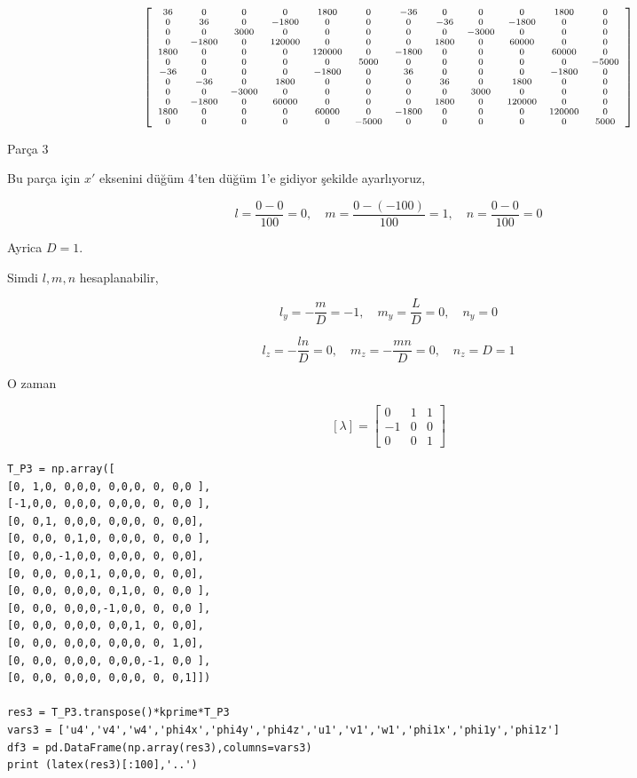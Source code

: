 \documentclass[12pt,fleqn]{article}\usepackage{../../common}
\begin{document}
$$
\scriptsize
\left[\begin{array}{cccccccccccc}36 & 0 & 0 & 0 & 1800 & 0 & -36 & 0 & 0 & 0 &
    1800 & 0\\0 & 36 & 0 & -1800 & 0 & 0 & 0 & -36 & 0 & -1800 & 0 & 0\\0 & 0 &
    3000 & 0 & 0 & 0 & 0 & 0 & -3000 & 0 & 0 & 0\\0 & -1800 & 0 & 120000 & 0 & 0
    & 0 & 1800 & 0 & 60000 & 0 & 0\\1800 & 0 & 0 & 0 & 120000 & 0 & -1800 & 0 &
    0 & 0 & 60000 & 0\\0 & 0 & 0 & 0 & 0 & 5000 & 0 & 0 & 0 & 0 & 0 & -5000\\-36
    & 0 & 0 & 0 & -1800 & 0 & 36 & 0 & 0 & 0 & -1800 & 0\\0 & -36 & 0 & 1800 & 0
    & 0 & 0 & 36 & 0 & 1800 & 0 & 0\\0 & 0 & -3000 & 0 & 0 & 0 & 0 & 0 & 3000 &
    0 & 0 & 0\\0 & -1800 & 0 & 60000 & 0 & 0 & 0 & 1800 & 0 & 120000 & 0 &
    0\\1800 & 0 & 0 & 0 & 60000 & 0 & -1800 & 0 & 0 & 0 & 120000 & 0\\0 & 0 & 0
    & 0 & 0 & -5000 & 0 & 0 & 0 & 0 & 0 & 5000\end{array}\right]
$$

Parça 3

Bu parça için $x'$ eksenini düğüm 4'ten düğüm 1'e gidiyor şekilde ayarlıyoruz,

$$
l = \frac{0 - 0}{100} = 0, \quad
m = \frac{0 - (-100)}{100} = 1, \quad
n = \frac{0 - 0}{100} = 0
$$

Ayrica $D = 1$.

Simdi $l,m,n$ hesaplanabilir,

$$
l_y = - \frac{m}{D} = -1, \quad
m_y = \frac{L}{D} = 0, \quad
n_y = 0
$$

$$
l_z = - \frac{ln}{D} = 0, \quad
m_z = - \frac{mn}{D} = 0, \quad
n_z = D = 1
$$

O zaman

$$
[ \lambda ] = \left[\begin{array}{rrr}
0 & 1 & 1 \\ -1 & 0 & 0 \\ 0 & 0 & 1
\end{array}\right]
$$

\begin{verbatim}
T_P3 = np.array([
[0, 1,0, 0,0,0, 0,0,0, 0, 0,0 ],
[-1,0,0, 0,0,0, 0,0,0, 0, 0,0 ],
[0, 0,1, 0,0,0, 0,0,0, 0, 0,0],
[0, 0,0, 0,1,0, 0,0,0, 0, 0,0 ],
[0, 0,0,-1,0,0, 0,0,0, 0, 0,0],
[0, 0,0, 0,0,1, 0,0,0, 0, 0,0],
[0, 0,0, 0,0,0, 0,1,0, 0, 0,0 ],
[0, 0,0, 0,0,0,-1,0,0, 0, 0,0 ],
[0, 0,0, 0,0,0, 0,0,1, 0, 0,0],
[0, 0,0, 0,0,0, 0,0,0, 0, 1,0],
[0, 0,0, 0,0,0, 0,0,0,-1, 0,0 ],
[0, 0,0, 0,0,0, 0,0,0, 0, 0,1]])

res3 = T_P3.transpose()*kprime*T_P3
vars3 = ['u4','v4','w4','phi4x','phi4y','phi4z','u1','v1','w1','phi1x','phi1y','phi1z']
df3 = pd.DataFrame(np.array(res3),columns=vars3)
print (latex(res3)[:100],'..')
\end{verbatim}
\end{document}
